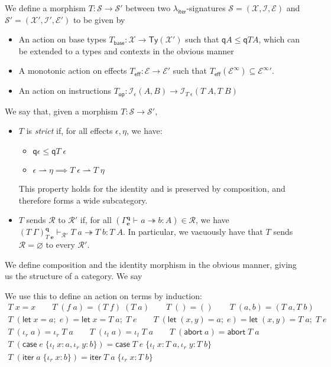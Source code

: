 \documentclass[acmsmall,screen,review]{acmart}
\newcommand{\mc}[1]{\ensuremath{\mathcal{#1}}}
\newcommand{\mb}[1]{\ensuremath{\mathbf{#1}}}
\newcommand{\ms}[1]{\ensuremath{\mathsf{#1}}}
\newcommand{\lto}{:}
\newcommand{\linl}[1]{\iota_l\;{#1}}
\newcommand{\linr}[1]{\iota_r\;{#1}}
\newcommand{\labort}[1]{\ms{abort}\;{#1}}
\newcommand{\letexpr}[3]{\ensuremath{\ms{let}\;#1 = #2;\;#3}}
\newcommand{\caseexpr}[5]{\ms{case}\;#1\;\{\linl{#2} \lto #3, \linr{#4} \lto #5\}}
\newcommand{\liter}[3]{\ms{iter}\;#1\;\{ \linr{#2} \lto #3 \}}
\newcommand{\tref}{\twoheadrightarrow}
\newcommand{\tmle}[5]{#1 \vdash_{#2} #3 \tref #4 : {#5}}
\newcommand{\subiterssa}{\(\lambda_{\ms{iter}}\)}
\newcommand{\rightmove}{\rightharpoonup}
\newcommand{\alquant}{\ms{q}}
\begin{document}
\begin{definition}[\subiterssa-signature morphism]
  We define a morphism $T: \mc{S} \to \mc{S}'$ between two \subiterssa-signatures $\mc{S} = (\mc{X},
  \mc{I}, \mc{E})$ and $\mc{S}' = (\mc{X}', \mc{I}', \mc{E}')$ to be given by
  \begin{itemize}
    \item An action on base types $T_{\ms{base}} : \mc{X} \to \ms{Ty}(\mc{X}')$ such that
    $\alquant{A} \leq \alquant{T A}$, which can be extended to a types and contexts in the obvious
    manner
    \item A monotonic action on effects $T_{\ms{eff}} : \mc{E} \to \mc{E}'$ such that
    $T_{\ms{eff}}(\mc{E}^\infty) \subseteq {\mc{E}^\infty}'$.
    \item An action on instructions $T_{\ms{op}} : \mc{I}_\epsilon(A, B) \to
    \mc{I}_{T\;\epsilon}(T\;A, T\;B)$
  \end{itemize}
  We say that, given a morphism $T : \mc{S} \to \mc{S}'$,
  \begin{itemize}
    \item $T$ is \emph{strict} if, for all effects $\epsilon, \eta$, we have:
    \begin{itemize}
      \item $\alquant{\epsilon} \leq \alquant{T\;\epsilon}$
      \item $\epsilon \rightmove \eta \implies T\;\epsilon \rightmove T\;\eta$
    \end{itemize} 
    This property holds for the identity and is preserved by composition, and therefore forms a wide
    subcategory.
    \item $T$ sends $\mc{R}$ to $\mc{R}'$ if, for all $(\tmle{\Gamma^{\mb{q}}_{\mb{e}}}{}{a}{b}{A})
    \in \mc{R}$, we have $\tmle{(T\;\Gamma)^{\mb{q}}_{T\;\mb{e}}}{\mc{R}'}{T\;a}{T\;b}{T\;A}$. In
    particular, we vacuously have that $T$ sends $\mc{R} = \varnothing$ to every $\mc{R}'$.
  \end{itemize}
  We define composition and the identity morphism in the obvious manner, giving us the structure of
  a category. We say 
\end{definition}

We use this to define an action on terms by induction:
\begin{gather*}
  T\;x = x \qquad T\;(f\;a) = (T\;f)\;(T\;a) \qquad T\;() = () \qquad T\;(a, b) = (T\;a, T\;b) \\
  T\;(\letexpr{x}{a}{e}) = \letexpr{x}{T\;a}{T\;e} \qquad
  T\;(\letexpr{(x, y)}{a}{e}) = \letexpr{(x, y)}{T\;a}{T\;e} \\
  T\;(\linr{a}) = \linr{T\;a} \qquad T\;(\linl{a}) = \linl{T\;a} \qquad
  T\;(\labort{a}) = \labort{T\;a} \\
  T\;(\caseexpr{e}{x}{a}{y}{b}) = \caseexpr{T\;e}{x}{T\;a}{y}{T\;b} \\
  T\;(\liter{a}{x}{b}) = \liter{T\;a}{x}{T\;b}
\end{gather*}
\end{document}
